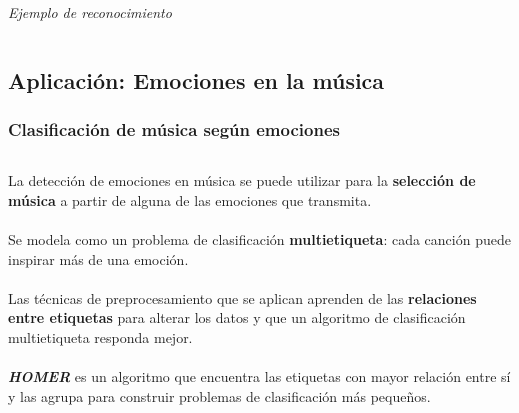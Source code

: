 \documentclass[8pt]{beamer}
\begin{document}
\begin{frame}
\begin{columns}[c]
\begin{column}{.5\textwidth}
\begin{center}
	  \\ \centering \textit{Ejemplo de reconocimiento}
	  \end{center}
       \end{column}
      \end{columns}
    \end{frame}


\subsection{Aplicación: Emociones en la música}
  \begin{frame}
	\frametitle{Clasificación de música según emociones}
	\begin{columns}[c]
		\begin{column}{.5\textwidth}
			La detección de emociones en música se puede utilizar para la 
			\textbf{selección de música} a partir de alguna de las emociones que transmita.
			\\~\\
			Se modela como un problema de clasificación \textbf{multietiqueta}:
			cada canción puede inspirar más de una emoción.
			\\~\\
			Las técnicas de preprocesamiento que se aplican aprenden de las
			\textbf{relaciones entre etiquetas} para alterar los datos y que
			un algoritmo de clasificación multietiqueta responda mejor.
			\\~\\
			\textbf{\textit{HOMER}} es un algoritmo que encuentra las etiquetas con mayor
			relación entre sí y las agrupa para construir problemas de clasificación
			más pequeños.
			

\end{column}
\end{columns}
\end{frame}
\end{document}
